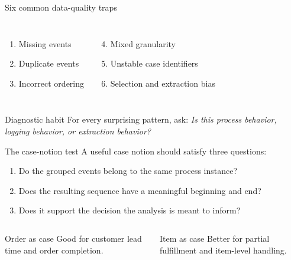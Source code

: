 \documentclass[aspectratio=169,11pt]{beamer}
\begin{document}
\begin{frame}{Six common data-quality traps}
  \begin{columns}[T,onlytextwidth]
      \begin{enumerate}
        \item Missing events
        \item Duplicate events
        \item Incorrect ordering
      \end{enumerate}
      \begin{enumerate}
        \setcounter{enumi}{3}
        \item Mixed granularity
        \item Unstable case identifiers
        \item Selection and extraction bias
      \end{enumerate}
  \end{columns}
  \vspace{0.55cm}
  \begin{block}{Diagnostic habit}
    For every surprising pattern, ask: \textit{Is this process behavior,
    logging behavior, or extraction behavior?}
  \end{block}
\end{frame}

\begin{frame}{The case-notion test}
  A useful case notion should satisfy three questions:
  \begin{enumerate}
    \item Do the grouped events belong to the same process instance?
    \item Does the resulting sequence have a meaningful beginning and end?
    \item Does it support the decision the analysis is meant to inform?
  \end{enumerate}
  \vspace{0.4cm}
  \begin{columns}[T,onlytextwidth]
      \begin{block}{Order as case}
        Good for customer lead time and order completion.
      \end{block}
      \begin{block}{Item as case}
        Better for partial fulfillment and item-level handling.
      \end{block}
  \end{columns}
\end{frame}
\end{document}
